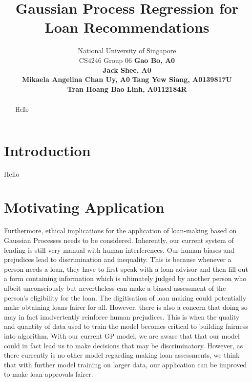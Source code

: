 \documentclass[a4paper]{article}
\theoremstyle{genius}
\begin{document}
%
\title{Gaussian Process Regression for Loan Recommendations}
\author{
National University of Singapore \\
CS4246 Group 06 \AND
\normalsize\normalfont\textbf{Gao Bo, A0} \\ 
\normalsize\normalfont\textbf{Jack Shee, A0} \\
\normalsize\normalfont\textbf{Mikaela Angelina Chan Uy, A0} \And
\normalsize\normalfont\textbf{Tang Yew Siang, A0139817U} \\
\normalsize\normalfont\textbf{Tran Hoang Bao Linh, A0112184R}
}

\maketitle
\begin{abstract}
Hello
\end{abstract}

\section{Introduction}
\noindent Hello

\section{Motivating Application}

Furthermore, ethical implications for the application of loan-making based on Gaussian Processes needs to be considered. Inherently, our current system of lending is still very manual with human interferences. Our human biases and prejudices lead to discrimination and inequality. This is because whenever a person needs a loan, they have to first speak with a loan advisor and then fill out a form containing information which is ultimately judged by another person who albeit unconsciously but nevertheless can make a biased assessment of the person’s eligibility for the loan. The digitisation of loan making could potentially make obtaining loans fairer for all. However, there is also a concern that doing so may in fact inadvertently reinforce human prejudices. This is when the quality and quantity of data used to train the model becomes critical to building fairness into algorithm. With our current GP model, we are aware that that our model could in fact lead us to make decisions that may be discriminatory. However, as there currently is no other model regarding making loan assessments, we think that with further model training on larger data, our application can be improved to make loan approvals fairer.  
\end{document}
